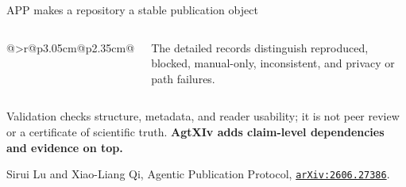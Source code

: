 \documentclass[aspectratio=169]{beamer}
\begin{document}
\begin{frame}{APP makes a repository a stable publication object}
\begin{columns}[T,onlytextwidth]
{\begin{tabular}{@{}>{\color{accent}\bfseries}r@{\quad}p{3.05cm}@{\quad}p{2.35cm}@{}}
      \end{tabular}}
      \vspace{0.08em}
      \parbox{5.8cm}{\centering\tiny\color{muted}The detailed records distinguish reproduced, blocked, manual-only, inconsistent, and privacy or path failures.}
  \end{columns}
  \vspace{0.12em}
  \centering\colorbox{accentlite}{\parbox{0.92\linewidth}{\centering\tiny Validation checks structure, metadata, and reader usability; it is not peer review or a certificate of scientific truth. \textbf{AgtXIv adds claim-level dependencies and evidence on top.}}}
  \vspace{0.04em}
  \begin{center}
    \tiny\color{muted}Sirui Lu and Xiao-Liang Qi, Agentic Publication Protocol, \href{https://arxiv.org/abs/2606.27386}{\texttt{arXiv:2606.27386}}.
  \end{center}
\end{frame}
\end{document}
